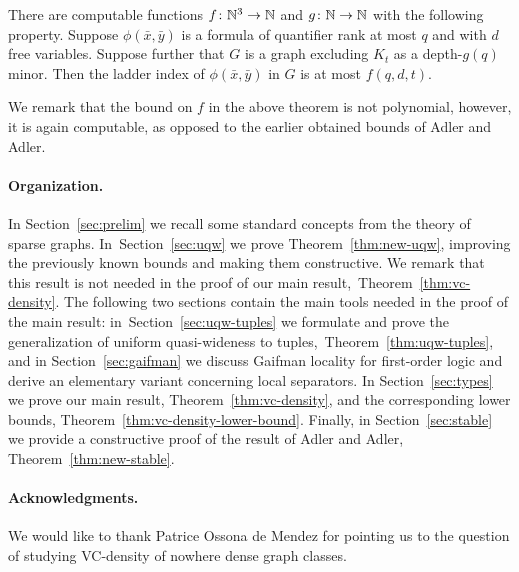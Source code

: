  \setcounter{stable}{\value{theorem}}
 \begin{theorem}\label{thm:new-stable}
   There are computable functions $f\colon \mathbb{N}^3\to\mathbb{N}$ and
   $g\colon\mathbb{N}\to\mathbb{N}$ with the following property.  Suppose
   $\phi(\bar x,\bar y)$ is a formula of quantifier rank at most $q$
   and with $d$ free variables.  Suppose further that $G$ is a graph
   excluding $K_t$ as a depth-$g(q)$ minor. Then the ladder index of
   $\phi(\bar x,\bar y)$ in $G$ is at most $f(q,d,t)$.
 \end{theorem}

We remark that the bound on $f$ in the above theorem is not
polynomial, however, it is again computable, as opposed to 
the earlier obtained bounds of Adler and Adler. 


\paragraph{Organization.} In Section~\ref{sec:prelim} we recall some
standard concepts from the theory of sparse graphs.
In~Section~\ref{sec:uqw} we prove Theorem~\ref{thm:new-uqw}, improving
the previously known bounds and making them constructive. We remark
that this result is not needed in the proof of our main
result,~Theorem~\ref{thm:vc-density}. The following two sections
contain the main tools needed in the proof of the main result:
in~Section~\ref{sec:uqw-tuples} we formulate and prove the
generalization of uniform quasi-wideness to
tuples,~Theorem~\ref{thm:uqw-tuples}, and
in Section~\ref{sec:gaifman} we discuss Gaifman locality for
first-order logic and derive an elementary variant concerning local
separators.  In Section~\ref{sec:types} we prove our main result,
Theorem~\ref{thm:vc-density}, and the corresponding lower bounds,
Theorem~\ref{thm:vc-density-lower-bound}.  Finally, in
Section~\ref{sec:stable} we provide a constructive proof of the result
of Adler and Adler, Theorem~\ref{thm:new-stable}.

\paragraph{Acknowledgments.} We would like to thank Patrice Ossona de
Mendez for pointing us to the question of studying VC-density of
nowhere dense graph classes.
